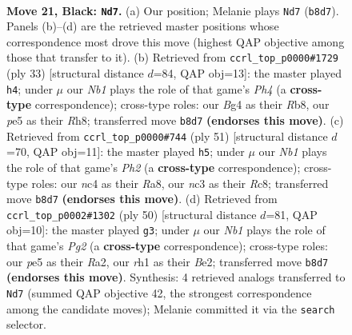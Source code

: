 \documentclass[11pt]{article}
\begin{document}
\clearpage

\begin{figure}[p]\centering
\begin{subfigure}{0.46\textwidth}\centering
\resizebox{\linewidth}{!}{%
\newchessgame
\chessboard[
  setfen={rnr5/1pp1bpkP/p7/P3P1p1/2N1P1b1/2N5/1P6/R3KB1R b KQ - 0 21},
  showmover=false,
  pgfstyle=straightmove, color=movearrow, markmove={b8-d7}
]}
\caption{}
\end{subfigure}\hfill
\begin{subfigure}{0.46\textwidth}\centering
\resizebox{\linewidth}{!}{%
\newchessgame
\chessboard[
  setfen={1r2k2r/2p1npp1/2pb4/p6p/4P3/2N1B1P1/PP1R1P1P/2R2K2 b k - 1 17},
  showmover=false,
  pgfstyle=straightmove, color=movearrow, markmove={h5-h4}
]}
\caption{}
\end{subfigure}
\\[4pt]
\begin{subfigure}{0.46\textwidth}\centering
\resizebox{\linewidth}{!}{%
\newchessgame
\chessboard[
  setfen={r1r3k1/1p3ppp/p3nb2/P2p4/1P5P/3P1NP1/R2B1P2/1R3K2 b - - 0 26},
  showmover=false,
  pgfstyle=straightmove, color=movearrow, markmove={h7-h5}
]}
\caption{}
\end{subfigure}\hfill
\begin{subfigure}{0.46\textwidth}\centering
\resizebox{\linewidth}{!}{%
\newchessgame
\chessboard[
  setfen={2b3k1/r3n1p1/p3pr1p/3p3P/N4P2/1PP5/R3B1P1/2K4R w - - 0 26},
  showmover=false,
  pgfstyle=straightmove, color=movearrow, markmove={g2-g3}
]}
\caption{}
\end{subfigure}
\caption{\textbf{Move 21, Black: \texttt{Nd7}.} (a) Our position; Melanie plays \texttt{Nd7} (\texttt{b8d7}). Panels (b)--(d) are the retrieved master positions whose correspondence most drove this move (highest QAP objective among those that transfer to it). (b) Retrieved from \texttt{ccrl\_top\_p0000\#1729} (ply 33) [structural distance $d$=84, QAP obj=13]: the master played \texttt{h4}; under $\mu$ our \emph{Nb1} plays the role of that game's \emph{Ph4} (a \textbf{cross-type} correspondence); cross-type roles: our \emph{B}g4 as their \emph{R}b8, our \emph{p}e5 as their \emph{R}h8; transferred move \texttt{b8d7} \textbf{(endorses this move)}. (c) Retrieved from \texttt{ccrl\_top\_p0000\#744} (ply 51) [structural distance $d$=70, QAP obj=11]: the master played \texttt{h5}; under $\mu$ our \emph{Nb1} plays the role of that game's \emph{Ph2} (a \textbf{cross-type} correspondence); cross-type roles: our \emph{n}c4 as their \emph{R}a8, our \emph{n}c3 as their \emph{R}c8; transferred move \texttt{b8d7} \textbf{(endorses this move)}. (d) Retrieved from \texttt{ccrl\_top\_p0002\#1302} (ply 50) [structural distance $d$=81, QAP obj=10]: the master played \texttt{g3}; under $\mu$ our \emph{Nb1} plays the role of that game's \emph{Pg2} (a \textbf{cross-type} correspondence); cross-type roles: our \emph{p}e5 as their \emph{R}a2, our \emph{r}h1 as their \emph{B}e2; transferred move \texttt{b8d7} \textbf{(endorses this move)}. Synthesis: 4 retrieved analogs transferred to \texttt{Nd7} (summed QAP objective 42, the strongest correspondence among the candidate moves); Melanie committed it via the \texttt{search} selector.}
\label{fig:thought-m41}
\end{figure}
\end{document}
